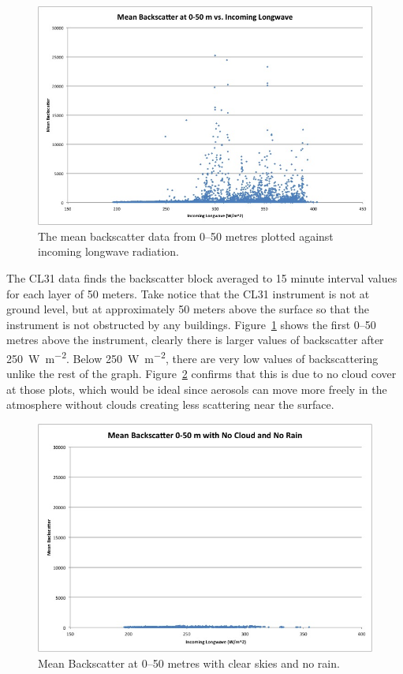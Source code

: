\documentclass[a4paper,titlepage, twoside]{report}
\begin{document}
\begin{figure}
\includegraphics[width=\textwidth]{8.jpg}
\caption{The mean backscatter data from 0--50 metres plotted against incoming longwave radiation.}
\label{fig:longwave-8}
\end{figure}

The CL31 data finds the backscatter block averaged to 15 minute interval values for each layer of 50 meters.  Take notice that the CL31 instrument is not at ground level, but at approximately 50 meters above the surface so that the instrument is not obstructed by any buildings.  Figure~\ref{fig:longwave-8} shows the first 0--50 metres above the instrument, clearly there is larger values of backscatter after \SI{250}{\watt\per\meter\squared}.  Below \SI{250}{\watt\per\meter\squared}, there are very low values of backscattering unlike the rest of the graph.  Figure~\ref{fig:longwave-14} confirms that this is due to no cloud cover at those plots, which would be ideal since aerosols can move more freely in the atmosphere without clouds creating less scattering near the surface.

\begin{figure}
\includegraphics[width=\textwidth]{14.jpg}
\caption{Mean Backscatter at 0--50 metres with clear skies and no rain.}
\label{fig:longwave-14}
\end{figure}
\end{document}
